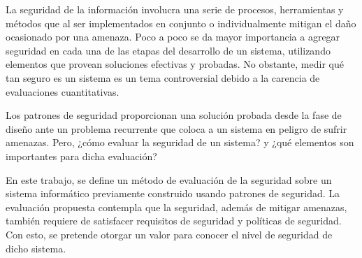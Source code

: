 La seguridad de la información involucra  una serie de procesos, herramientas y métodos que al ser implementados en conjunto o individualmente mitigan el daño ocasionado por una amenaza. Poco a poco se da mayor importancia a agregar seguridad en cada una de las etapas del desarrollo de un sistema, utilizando elementos que provean soluciones efectivas y probadas. No obstante, medir qué tan seguro es un sistema es un tema controversial debido a la carencia de evaluaciones cuantitativas.
\vspace{0.3cm}

Los patrones de seguridad proporcionan una solución probada desde la fase de diseño ante un problema recurrente que coloca a un sistema en peligro de sufrir amenazas. Pero, ¿cómo evaluar la seguridad de un sistema? y ¿qué elementos son importantes para dicha evaluación? 

\vspace{0.3cm}

En este trabajo, se define un método de evaluación de la seguridad sobre un sistema informático previamente construido usando patrones de seguridad. La evaluación propuesta contempla que la seguridad, además de mitigar amenazas, también requiere de satisfacer requisitos de seguridad y políticas de seguridad. Con esto, se pretende otorgar un valor para conocer el nivel de seguridad de dicho sistema.

